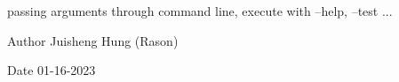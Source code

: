 passing arguments through command line, execute with --help, --test ... \begin{DoxyAuthor}{Author}
Juisheng Hung (Rason) 
\end{DoxyAuthor}
\begin{DoxyDate}{Date}
01-\/16-\/2023 
\end{DoxyDate}
